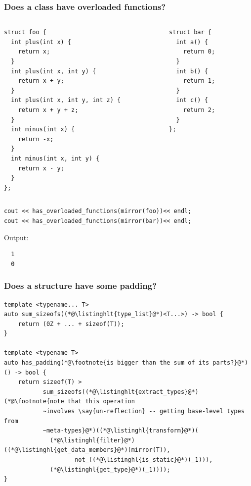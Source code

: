 \documentclass[compress,table,xcolor=table]{beamer}
\begin{document}
\begin{frame}[fragile]
  \frametitle{Does a class have overloaded functions?}
  \begin{columns}
    \begin{column}{.50\textwidth}
      \begin{lstlisting}[language=c++2x,basicstyle=\tiny\ttfamily]
struct foo {
  int plus(int x) {
    return x;
  }
  int plus(int x, int y) {
    return x + y;
  }
  int plus(int x, int y, int z) {
    return x + y + z;
  }
  int minus(int x) {
    return -x;
  }
  int minus(int x, int y) {
    return x - y;
  }
};
      \end{lstlisting}
    \end{column}
    \begin{column}{.40\textwidth}
      \begin{lstlisting}[language=c++2x,basicstyle=\scriptsize\ttfamily]
struct bar {
  int a() {
    return 0;
  }
  int b() {
    return 1;
  }
  int c() {
    return 2;
  }
};
      \end{lstlisting}
    \end{column}
  \end{columns}
  \begin{lstlisting}[language=c++2x,basicstyle=\footnotesize\ttfamily]
cout << has_overloaded_functions(mirror(foo))<< endl;
cout << has_overloaded_functions(mirror(bar))<< endl;
  \end{lstlisting}
  Output:
  \begin{verbatim}
  1
  0
  \end{verbatim}
\end{frame}
\begin{frame}[fragile]
  \frametitle{Does a structure have some padding?}
  \begin{lstlisting}[language=c++2x,basicstyle=\footnotesize\ttfamily]
template <typename... T>
auto sum_sizeofs((*@\listinghlt{type_list}@*)<T...>) -> bool {
    return (0Z + ... + sizeof(T));
}

template <typename T>
auto has_padding(*@\footnote{is bigger than the sum of its parts?}@*)() -> bool {
    return sizeof(T) >
           sum_sizeofs((*@\listinghlt{extract_types}@*)(*@\footnote{note that this operation
           ~involves \say{un-reflection} -- getting base-level types from
           ~meta-types}@*)((*@\listinghl{transform}@*)(
             (*@\listinghl{filter}@*)((*@\listinghl{get_data_members}@*)(mirror(T)),
                    not_((*@\listinghl{is_static}@*)(_1))),
             (*@\listinghl{get_type}@*)(_1))));
}
  \end{lstlisting}
\end{frame}
\end{document}
